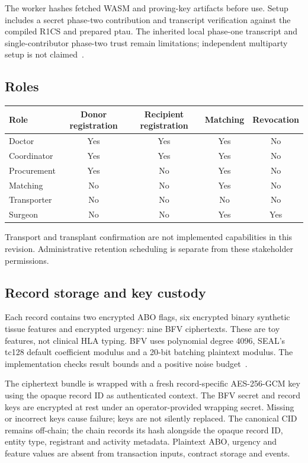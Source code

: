 \documentclass[11pt,a4paper]{article}
\begin{document}
The worker hashes fetched WASM and proving-key artifacts before use. Setup includes a secret phase-two contribution and transcript verification against the compiled R1CS and prepared ptau. The inherited local phase-one transcript and single-contributor phase-two trust remain limitations; independent multiparty setup is not claimed~\cite{groth}.

\subsection{Roles}
\begin{center}
\begin{tabular}{lcccc}
\toprule Role & Donor registration & Recipient registration & Matching & Revocation\\\midrule
Doctor & Yes & Yes & Yes & No\\
Coordinator & Yes & Yes & Yes & No\\
Procurement & Yes & No & Yes & No\\
Matching & No & No & Yes & No\\
Transporter & No & No & No & No\\
Surgeon & No & No & Yes & Yes\\\bottomrule
\end{tabular}
\end{center}
Transport and transplant confirmation are not implemented capabilities in this revision. Administrative retention scheduling is separate from these stakeholder permissions.

\subsection{Record storage and key custody}
Each record contains two encrypted ABO flags, six encrypted binary synthetic tissue features and encrypted urgency: nine BFV ciphertexts. These are toy features, not clinical HLA typing. BFV uses polynomial degree 4096, SEAL's tc128 default coefficient modulus and a 20-bit batching plaintext modulus. The implementation checks result bounds and a positive noise budget~\cite{seal}.

The ciphertext bundle is wrapped with a fresh record-specific AES-256-GCM key using the opaque record ID as authenticated context. The BFV secret and record keys are encrypted at rest under an operator-provided wrapping secret. Missing or incorrect keys cause failure; keys are not silently replaced. The canonical CID remains off-chain; the chain records its hash alongside the opaque record ID, entity type, registrant and activity metadata. Plaintext ABO, urgency and feature values are absent from transaction inputs, contract storage and events.
\end{document}
